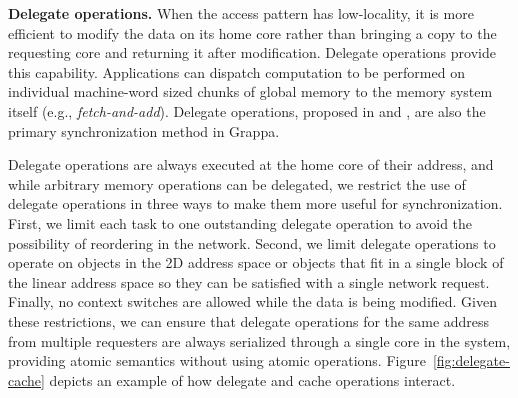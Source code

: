 \textbf{Delegate operations.} When the access pattern has low-locality,
it is more efficient to modify the data on its home core rather than
bringing a copy to the requesting core and returning it after
modification. Delegate operations provide this capability. Applications
can dispatch computation to be performed on individual machine-word
sized chunks of global memory to the memory system itself (e.g.,
\emph{fetch-and-add}).  Delegate operations, proposed in
\cite{Nelson:hotpar11} and \cite{delegated:oopsla11}, are also the
primary synchronization method in Grappa.

Delegate operations are always executed at the home core of their
address, and while arbitrary memory operations can be delegated, we
restrict the use of delegate operations in three ways to make them more
useful for synchronization. First, we limit each task to one outstanding
delegate operation to avoid the possibility of reordering in the
network. Second, we limit delegate operations to operate on objects in
the 2D address space or objects that fit in a single block of the linear
address space so they can be satisfied with a single network request.
Finally, no context switches are allowed while the data is being
modified. Given these restrictions, we can ensure that delegate
operations for the same address from multiple requesters are always
serialized through a single core in the system, providing atomic
semantics without using atomic operations. 
Figure~\ref{fig:delegate-cache} depicts an example of how delegate and
cache operations interact.

